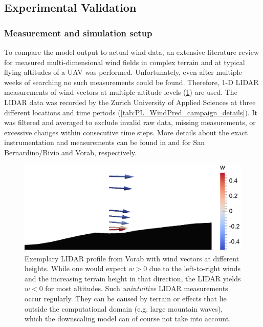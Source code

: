 \documentclass[twocolumn,letterpaper]{IEEEAerospaceCLS}
\begin{document}
\subsection{Experimental Validation}
\label{sec:PL_WindPred_PrelResults_Experimental}

\subsubsection{Measurement and simulation setup}
\label{sec:PL_WindPred_meas_setup}

To compare the model output to actual wind data, an extensive literature review for measured multi-dimensional wind fields in complex terrain and at typical flying altitudes of a \ac{UAV} was performed. Unfortunately, even after multiple weeks of searching no such measurements could be found. Therefore, 1-D LIDAR measurements of wind vectors at multiple altitude levels (\cref{fig:PL_WindPred_vorab_lidar}) are used. The LIDAR data was recorded by the Zurich University of Applied Sciences at three different locations and time periods (\cref{tab:PL_WindPred_campaign_details}). It was filtered and averaged to exclude invalid raw data, missing measurements, or excessive changes within consecutive time steps. More details about the exact instrumentation and measurements can be found in \cite{Kuratle2015} and \cite{Hasler2016} for San Bernardino/Bivio and Vorab, respectively. 

\begin{figure}[htbp]
\centering
\includegraphics[width=\columnwidth]{images/WindPred/Results/vorab_331_lidar.png}
\caption[LIDAR profile Vorab]{Exemplary LIDAR profile from Vorab with wind vectors at different heights. While one would expect $w>0$ due to the left-to-right winds and the increasing terrain height in that direction, the LIDAR yields $w<0$ for most altitudes. Such \emph{unintuitive} LIDAR measurements occur regularly. They can be caused by terrain or effects that lie outside the computational domain (e.g. large mountain waves), which the downscaling model can of course not take into account.}
\label{fig:PL_WindPred_vorab_lidar}
\end{figure}
\end{document}
